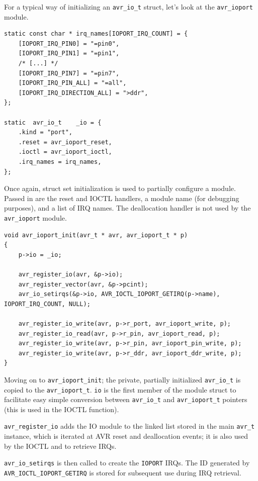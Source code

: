 For a typical way of initializing an \lstinline|avr_io_t| struct, let's look at
the \verb|avr_ioport| module.

\begin{lstlisting}
static const char * irq_names[IOPORT_IRQ_COUNT] = {
    [IOPORT_IRQ_PIN0] = "=pin0",
    [IOPORT_IRQ_PIN1] = "=pin1",
    /* [...] */
    [IOPORT_IRQ_PIN7] = "=pin7",
    [IOPORT_IRQ_PIN_ALL] = "=all",
    [IOPORT_IRQ_DIRECTION_ALL] = ">ddr",
};

static  avr_io_t    _io = {
    .kind = "port",
    .reset = avr_ioport_reset,
    .ioctl = avr_ioport_ioctl,
    .irq_names = irq_names,
};
\end{lstlisting}

Once again, struct set initialization is used to partially configure a module.
Passed in are the reset and \ac{IOCTL} handlers, a module name (for debugging
purposes), and a list of \ac{IRQ} names. The deallocation handler is not used
by the \verb|avr_ioport| module.

\begin{lstlisting}
void avr_ioport_init(avr_t * avr, avr_ioport_t * p)
{
    p->io = _io;

    avr_register_io(avr, &p->io);
    avr_register_vector(avr, &p->pcint);
    avr_io_setirqs(&p->io, AVR_IOCTL_IOPORT_GETIRQ(p->name), IOPORT_IRQ_COUNT, NULL);

    avr_register_io_write(avr, p->r_port, avr_ioport_write, p);
    avr_register_io_read(avr, p->r_pin, avr_ioport_read, p);
    avr_register_io_write(avr, p->r_pin, avr_ioport_pin_write, p);
    avr_register_io_write(avr, p->r_ddr, avr_ioport_ddr_write, p);
}
\end{lstlisting}

Moving on to \lstinline|avr_ioport_init|; the private, partially initialized
\lstinline|avr_io_t| is copied to the \lstinline|avr_ioport_t|. \lstinline|io|
is the first member of the module struct to facilitate easy simple conversion
between \lstinline|avr_io_t| and \lstinline|avr_ioport_t| pointers (this is used
in the \ac{IOCTL} function).

\lstinline|avr_register_io| adds the \ac{IO} module
to the linked list stored in the main \lstinline|avr_t| instance, which is iterated
at \ac{AVR} reset and deallocation events; it is also used by the \ac{IOCTL} and
to retrieve \acp{IRQ}.

\lstinline|avr_io_setirqs| is then called to create the \lstinline|IOPORT| \acp{IRQ}.
The \ac{ID} generated by \lstinline|AVR_IOCTL_IOPORT_GETIRQ| is stored for subsequent
use during \ac{IRQ} retrieval.

